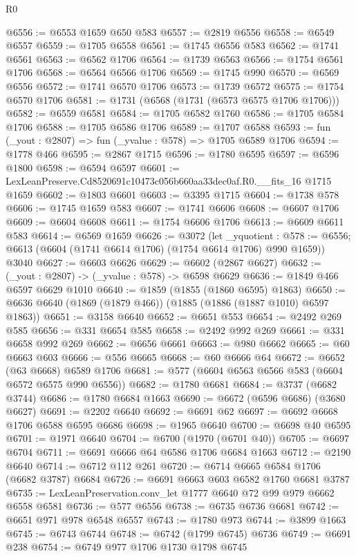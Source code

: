 \begin{lexlean}{R0}
\begin{coremodule}
@6556 := @6553 @1659 @650 @583
@6557 := @2819 @6556
@6558 := @6549 @6557
@6559 := @1705 @6558
@6561 := @1745 @6556 @583
@6562 := @1741 @6561
@6563 := @6562 @1706
@6564 := @1739 @6563
@6566 := @1754 @6561 @1706
@6568 := @6564 @6566 @1706
@6569 := @1745 @990
@6570 := @6569 @6556
@6572 := @1741 @6570 @1706
@6573 := @1739 @6572
@6575 := @1754 @6570 @1706
@6581 := @1731 (@6568 (@1731 (@6573 @6575 @1706 @1706)))
@6582 := @6559 @6581
@6584 := @1705 @6582 @1760
@6586 := @1705 @6584 @1706
@6588 := @1705 @6586 @1706
@6589 := @1707 @6588
@6593 := fun (_yout : @2807) => fun (_yvalue : @578) => @1705 @6589 @1706
@6594 := @1778 @466
@6595 := @2867 @1715
@6596 := @1780 @6595
@6597 := @6596 @1800
@6598 := @6594 @6597
@6601 := LexLeanPreserve.Cd8520691c10473c056b660aa33dec0af.R0.__fits_16 @1715 @1659
@6602 := @1803 @6601
@6603 := @3395 @1715
@6604 := @1738 @578
@6606 := @1745 @1659 @583
@6607 := @1741 @6606
@6608 := @6607 @1706
@6609 := @6604 @6608
@6611 := @1754 @6606 @1706
@6613 := @6609 @6611 @583
@6614 := @6569 @1659
@6626 := @3072
    (let _yquotient : @578 := @6556;
    @6613 (@6604 (@1741 @6614 @1706) (@1754 @6614 @1706) @990 @1659))
    @3040
@6627 := @6603 @6626
@6629 := @6602 (@2867 @6627)
@6632 := (_yout : @2807) -> (_yvalue : @578) -> @6598 @6629
@6636 := @1849 @466 @6597 @6629 @1010
@6640 := @1859 (@1855 (@1860 @6595) @1863)
@6650 := @6636 @6640 (@1869 (@1879 @466)) (@1885 (@1886 (@1887 @1010) @6597 @1863))
@6651 := @3158 @6640
@6652 := @6651 @553
@6654 := @2492 @269 @585
@6656 := @331 @6654 @585
@6658 := @2492 @992 @269
@6661 := @331 @6658 @992 @269
@6662 := @6656 @6661
@6663 := @980 @6662
@6665 := @60 @6663 @603
@6666 := @556 @6665
@6668 := @60 @6666 @64
@6672 := @6652 (@63 @6668) @6589 @1706
@6681 := @577 (@6604 @6563 @6566 @583 (@6604 @6572 @6575 @990 @6556))
@6682 := @1780 @6681
@6684 := @3737 (@6682 @3744)
@6686 := @1780 @6684 @1663
@6690 := @6672 (@6596 @6686) (@3680 @6627)
@6691 := @2202 @6640
@6692 := @6691 @62
@6697 := @6692 @6668 @1706 @6588 @6595 @6686
@6698 := @1965 @6640
@6700 := @6698 @40 @6595
@6701 := @1971 @6640
@6704 := @6700 (@1970 (@6701 @40))
@6705 := @6697 @6704
@6711 := @6691 @6666 @64 @6586 @1706 @6684 @1663
@6712 := @2190 @6640
@6714 := @6712 @112 @261
@6720 := @6714 @6665 @6584 @1706 (@6682 @3787) @6684
@6726 := @6691 @6663 @603 @6582 @1760 @6681 @3787
@6735 := LexLeanPreservation.conv_let @1777 @6640 @72 @99 @979 @6662 @6558 @6581
@6736 := @577 @6556
@6738 := @6735 @6736 @6681
@6742 := @6651 @971 @978 @6548 @6557
@6743 := @1780 @973
@6744 := @3899 @1663
@6745 := @6743 @6744
@6748 := @6742 (@1799 @6745) @6736
@6749 := @6691 @238
@6754 := @6749 @977 @1706 @1730 @1798 @6745

\end{coremodule}
\end{lexlean}
